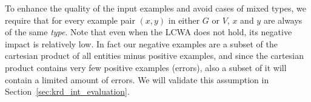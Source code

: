 To enhance the quality of the input examples and avoid cases of mixed types, 
we require that for every example pair $(x,y)$ in either $G$ or $V$, $x$ and $y$ are always of the same \emph{type}. 
Note that even when the LCWA does not hold, its negative impact is relatively low. In fact our negative examples are a subset of the cartesian product of all entities minus positive examples, and since the cartesian product contains very few positive examples (errors), also a subset of it will contain a limited amount of errors. We will validate this assumption in Section~\ref{sec:krd_int_evaluation}.



